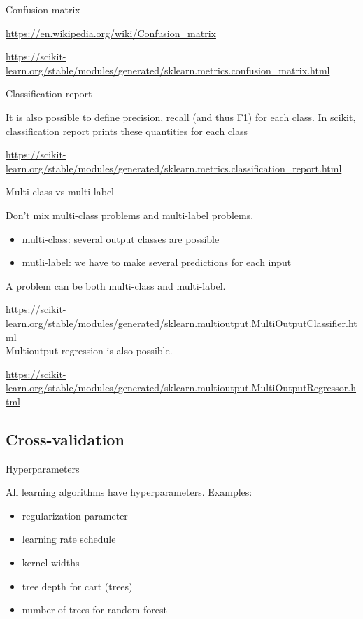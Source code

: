 \documentclass[usenames,dvipsnames,french]{beamer}
\begin{document}
\begin{frame}{Confusion matrix}

    \url{https://en.wikipedia.org/wiki/Confusion_matrix} 

    \url{https://scikit-learn.org/stable/modules/generated/sklearn.metrics.confusion_matrix.html} 
    
\end{frame}

\begin{frame}{Classification report}

    It is also possible to define precision, recall (and thus F1) for each
    class. In scikit, classification report prints these quantities for each
    class

    \url{https://scikit-learn.org/stable/modules/generated/sklearn.metrics.classification_report.html} 
    
\end{frame}

\begin{frame}{Multi-class vs multi-label}

    Don't mix multi-class problems and multi-label problems.
    \begin{itemize}
        \item multi-class: several output classes are possible
        \item mutli-label: we have to make several predictions for each input
    \end{itemize}

    A problem can be both multi-class and multi-label.

    \url{https://scikit-learn.org/stable/modules/generated/sklearn.multioutput.MultiOutputClassifier.html} 
    \\

    Multioutput regression is also possible.

    \url{https://scikit-learn.org/stable/modules/generated/sklearn.multioutput.MultiOutputRegressor.html} 
    
\end{frame}

\subsection{Cross-validation}%
\label{sub:cross_validation}

\begin{frame}{Hyperparameters}

    All learning algorithms have hyperparameters. Examples:
    \begin{itemize}
        \item regularization parameter 
        \item learning rate schedule
        \item kernel widths
	\item tree depth for cart (trees)
        \item number of trees for random forest
    \end{itemize}
    
\end{frame}
\end{document}

